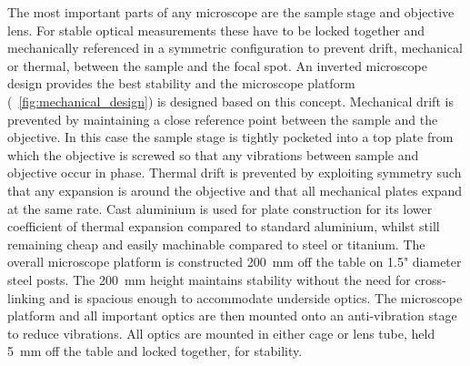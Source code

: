 \documentclass{article}
\begin{document}
The most important parts of any microscope are the sample stage and objective lens. For stable optical measurements these have to be locked together and mechanically referenced in a symmetric configuration to prevent drift, mechanical or thermal, between the sample and the focal spot. An inverted microscope design provides the best stability and the microscope platform (\figurename~\ref{fig:mechanical_design}) is designed based on this concept.
Mechanical drift is prevented by maintaining a close reference point between the sample and the objective. In this case the sample stage is tightly pocketed into a top plate from which the objective is screwed so that any vibrations between sample and objective occur in phase.
Thermal drift is prevented by exploiting symmetry such that any expansion is around the objective and that all mechanical plates expand at the same rate. Cast aluminium is used for plate construction for its lower coefficient of thermal expansion compared to {\color{red}standard} aluminium, whilst still remaining cheap and easily machinable compared to steel or titanium.
The overall microscope platform is constructed \SI{200}{mm} off the table on 1.5" diameter steel posts. The \SI{200}{mm} height maintains stability without the need for cross-linking and is spacious enough to accommodate underside optics. The microscope platform and all important optics are then mounted onto an anti-vibration stage to reduce vibrations. All optics are mounted in either cage or lens tube, held \SI{5}{mm} off the table and locked together, for stability.
\end{document}
